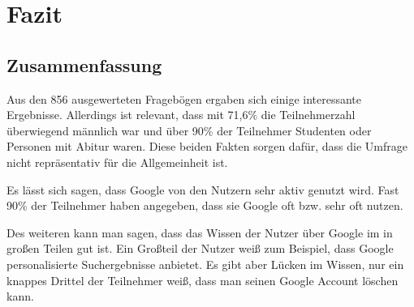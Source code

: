 %
% 

\chapter{Fazit}


\section{Zusammenfassung}
Aus den 856 ausgewerteten Fragebögen ergaben sich einige interessante Ergebnisse. Allerdings ist relevant, dass mit 71,6\% die Teilnehmerzahl überwiegend männlich war und über 90\% der Teilnehmer Studenten oder Personen mit Abitur waren. Diese beiden Fakten sorgen dafür, dass die Umfrage nicht repräsentativ für die Allgemeinheit ist.

Es lässt sich sagen, dass Google von den Nutzern sehr aktiv genutzt wird. Fast 90\% der Teilnehmer haben angegeben, dass sie Google oft bzw. sehr oft nutzen.

Des weiteren kann man sagen, dass das Wissen der Nutzer über Google im in großen Teilen gut ist. Ein Großteil der Nutzer weiß zum Beispiel, dass Google personalisierte Suchergebnisse anbietet. Es gibt aber Lücken im Wissen, nur ein knappes Drittel der Teilnehmer weiß, dass man seinen Google Account löschen kann.

